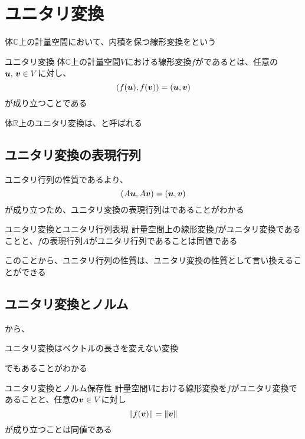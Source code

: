 \documentclass[../../../topic_linear-algebra]{subfiles}
\begin{document}
\sectionline
\section{ユニタリ変換}

体$\mathbb{C}$上の計量空間において、内積を保つ線形変換をという

\begin{definition}{ユニタリ変換}
  体$\mathbb{C}$上の計量空間$V$における線形変換$f$がであるとは、任意の$\vb*{u},\,\vb*{v} \in V$に対し、
  \begin{equation*}
    (f(\vb*{u}),f(\vb*{v})) = (\vb*{u},\vb*{v})
  \end{equation*}
  が成り立つことである
\end{definition}

体$\mathbb{R}$上のユニタリ変換は、と呼ばれる

\subsection{ユニタリ変換の表現行列}

ユニタリ行列の性質であるより、
\begin{equation*}
  (A\vb*{u}, A\vb*{v}) = (\vb*{u}, \vb*{v})
\end{equation*}
が成り立つため、ユニタリ変換の表現行列はであることがわかる

\begin{theorem*}{ユニタリ変換とユニタリ行列表現}
  計量空間上の線形変換$f$がユニタリ変換であることと、$f$の表現行列$A$がユニタリ行列であることは同値である
\end{theorem*}

このことから、ユニタリ行列の性質は、ユニタリ変換の性質として言い換えることができる

\subsection{ユニタリ変換とノルム}

から、
\begin{shaded}
  ユニタリ変換はベクトルの長さを変えない変換
\end{shaded}
でもあることがわかる

\begin{theorem*}{ユニタリ変換とノルム保存性}
  計量空間$V$における線形変換を$f$がユニタリ変換であることと、任意の$\vb*{v} \in V$に対し
  \begin{equation*}
    \|f(\vb*{v})\| = \|\vb*{v}\|
  \end{equation*}
  が成り立つことは同値である
\end{theorem*}
\end{document}
